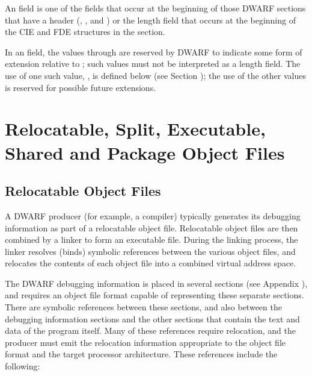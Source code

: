 An  field 
is one of the fields that occur at the beginning 
of those DWARF sections that have a header
(\dotdebugaranges{}, 
\dotdebuginfo{}, 
\dotdebugline{} and
\dotdebugnames{}) or the length field
that occurs at the beginning of the CIE and FDE structures
in the \dotdebugframe{} section.

In an  field, the values \wfffffffzero through
\wffffffff are reserved by DWARF to indicate some form of
extension relative to \DWARFVersionII; such values must not
be interpreted as a length field. The use of one such value,
\xffffffff, is defined below 
(see Section ); 
the use of
the other values is reserved for possible future extensions.



\section{Relocatable, Split, Executable, Shared and Package Object Files} 
\label{datarep:executableobjectsandsharedobjects}

\subsection{Relocatable Object Files}
\label{datarep:relocatableobjectfiles}
A DWARF producer (for example, a compiler) typically generates its
debugging information as part of a relocatable object file.
Relocatable object files are then combined by a linker to form an
executable file. During the linking process, the linker resolves
(binds) symbolic references between the various object files, and
relocates the contents of each object file into a combined virtual
address space.

The DWARF debugging information is placed in several sections (see
Appendix ), and 
requires an object file format capable of
representing these separate sections. There are symbolic references
between these sections, and also between the debugging information
sections and the other sections that contain the text and data of the
program itself. Many of these references require relocation, and the
producer must emit the relocation information appropriate to the
object file format and the target processor architecture. These
references include the following:

